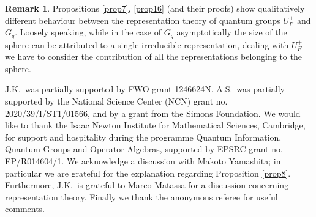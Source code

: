 \documentclass[11 pt, leqno]{amsart}
\theoremstyle{definition}
\newtheorem{remark}[theorem]{Remark}
\numberwithin{equation}{section}
\begin{document}
\begin{remark}
	Propositions \ref{prop7}, \ref{prop16} (and their proofs) show qualitatively different behaviour between the representation theory of quantum groups $U_F^+$ and $G_q$. Loosely speaking, while in the case of $G_q$ asymptotically  the size of the sphere can be attributed to a single irreducible representation, %
dealing with $U_F^+$ we have to consider the contribution of all the representations belonging to the sphere.%
\end{remark}

 \smallskip

J.K.\ was partially supported by FWO grant 1246624N. A.S.\ was  partially supported by the National Science Center (NCN) grant no. 2020/39/I/ST1/01566, and by a grant from the Simons Foundation. We would like to thank the Isaac Newton Institute for Mathematical Sciences, Cambridge, for support and hospitality during the programme Quantum Information, Quantum Groups and Operator Algebras, supported by EPSRC grant no. EP/R014604/1. We acknowledge a discussion with Makoto Yamashita; in particular we are grateful for the explanation regarding Proposition \ref{prop8}. Furthermore, J.K.~is grateful to Marco Matassa for a discussion concerning representation theory. Finally we thank the anonymous referee for useful comments.

\end{document}
